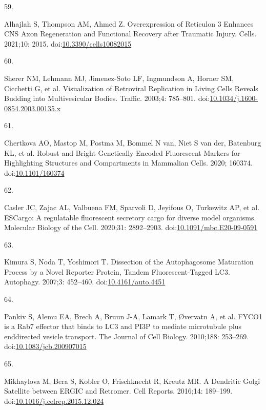 \documentclass[
  12pt,
  a4paper,
]{book}
\newlength{\cslhangindent}
\newlength{\csllabelwidth}
\newlength{\cslentryspacingunit} %
\newenvironment{CSLReferences}[2] %
 {%
  \setlength{\parindent}{0pt}
  \ifodd #1
  \let\oldpar\par
  \def\par{\hangindent=\cslhangindent\oldpar}
  \fi
  \setlength{\parskip}{#2\cslentryspacingunit}
 }%
 {}
\newcommand{\CSLLeftMargin}[1]{\parbox[t]{\csllabelwidth}{#1}}
\newcommand{\CSLRightInline}[1]{\parbox[t]{\linewidth - \csllabelwidth}{#1}\break}
\begin{document}
\begin{CSLReferences}{0}{0}
\leavevmode{}%
\CSLLeftMargin{59. }%
\CSLRightInline{Alhajlah S, Thompson AM, Ahmed Z. Overexpression of {Reticulon} 3 {Enhances CNS Axon Regeneration} and {Functional Recovery} after {Traumatic Injury}. Cells. 2021;10: 2015. doi:\href{https://doi.org/10.3390/cells10082015}{10.3390/cells10082015}}

\leavevmode{}%
\CSLLeftMargin{60. }%
\CSLRightInline{Sherer NM, Lehmann MJ, Jimenez-Soto LF, Ingmundson A, Horner SM, Cicchetti G, et al. Visualization of {Retroviral Replication} in {Living Cells Reveals Budding} into {Multivesicular Bodies}. Traffic. 2003;4: 785--801. doi:\href{https://doi.org/10.1034/j.1600-0854.2003.00135.x}{10.1034/j.1600-0854.2003.00135.x}}

\leavevmode{}%
\CSLLeftMargin{61. }%
\CSLRightInline{Chertkova AO, Mastop M, Postma M, Bommel N van, Niet S van der, Batenburg KL, et al. Robust and {Bright Genetically Encoded Fluorescent Markers} for {Highlighting Structures} and {Compartments} in {Mammalian Cells}. 2020; 160374. doi:\href{https://doi.org/10.1101/160374}{10.1101/160374}}

\leavevmode{}%
\CSLLeftMargin{62. }%
\CSLRightInline{Casler JC, Zajac AL, Valbuena FM, Sparvoli D, Jeyifous O, Turkewitz AP, et al. {ESCargo}: A regulatable fluorescent secretory cargo for diverse model organisms. Molecular Biology of the Cell. 2020;31: 2892--2903. doi:\href{https://doi.org/10.1091/mbc.E20-09-0591}{10.1091/mbc.E20-09-0591}}

\leavevmode{}%
\CSLLeftMargin{63. }%
\CSLRightInline{Kimura S, Noda T, Yoshimori T. Dissection of the {Autophagosome Maturation Process} by a {Novel Reporter Protein}, {Tandem Fluorescent-Tagged LC3}. Autophagy. 2007;3: 452--460. doi:\href{https://doi.org/10.4161/auto.4451}{10.4161/auto.4451}}

\leavevmode{}%
\CSLLeftMargin{64. }%
\CSLRightInline{Pankiv S, Alemu EA, Brech A, Bruun J-A, Lamark T, Øvervatn A, et al. {FYCO1} is a {Rab7} effector that binds to {LC3} and {PI3P} to mediate microtubule plus end\textendash directed vesicle transport. The Journal of Cell Biology. 2010;188: 253--269. doi:\href{https://doi.org/10.1083/jcb.200907015}{10.1083/jcb.200907015}}

\leavevmode{}%
\CSLLeftMargin{65. }%
\CSLRightInline{Mikhaylova M, Bera S, Kobler O, Frischknecht R, Kreutz MR. A {Dendritic Golgi Satellite} between {ERGIC} and {Retromer}. Cell Reports. 2016;14: 189--199. doi:\href{https://doi.org/10.1016/j.celrep.2015.12.024}{10.1016/j.celrep.2015.12.024}}


\end{CSLReferences}
\end{document}
